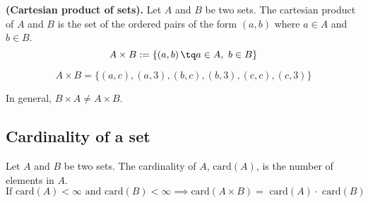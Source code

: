 \begin{definition}
    \textbf{(Cartesian product of sets).} Let $A$ and $B$ be two sets. The cartesian product of $A$ and $B$ is the set of the ordered pairs of the form $\left( a, b \right)$ where $a\in A$ and $b\in B$.
    \begin{equation}
        A\times B := \{\left( a, b \right) \tq a\in A,\ b\in B\} 
    \end{equation}
\end{definition}

\begin{example}[Let $A = \{a, b, c\} $ and $B = \{c, 3\} $.]
    \begin{equation}
        A\times B = \{\left( a, c \right), \left( a, 3 \right), \left( b, c \right), \left( b, 3 \right), \left( c, c \right), \left( c, 3 \right)\}
    \end{equation}
\end{example}
\begin{note}
    In general, $B\times A\neq A\times B$.
\end{note}

\subsection{Cardinality of a set}
\begin{definition}
    Let $A$ and $B$ be two sets. The cardinality of $A$, $\textrm{card}\left( A \right) $, is the number of elements in $A$.
    \begin{equation}
        \textrm{If card}\left( A \right) < \infty\textrm{ and } \textrm{card}\left( B \right) < \infty \implies \textrm{card}\left( A\times B \right) = \textrm{ card}\left( A \right)\cdot \textrm{ card}\left( B \right)   
    \end{equation}
\end{definition}
